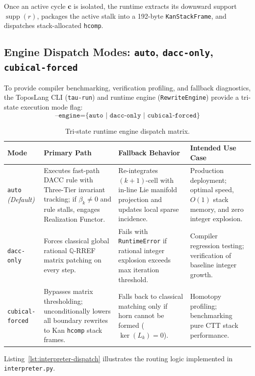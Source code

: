 \documentclass[acmsmall,screen,nonacm]{acmart}
\newcommand{\supp}{\operatorname{supp}}
\newcommand{\hcomp}{\texttt{hcomp}}
\newcommand{\KSF}{\texttt{KanStackFrame}}
\newcommand{\betak}{\beta_k}
\begin{document}
Once an active cycle $\mathbf{c}$ is isolated, the runtime extracts its downward support $\supp(r)$, packages the active stalk into a 192-byte \KSF{}, and dispatches stack-allocated \hcomp{}.

\subsection{Engine Dispatch Modes: \texttt{auto}, \texttt{dacc-only}, \texttt{cubical-forced}}
\label{sec:engine-modes}

To provide compiler benchmarking, verification profiling, and fallback diagnostics, the ToposLang CLI (\texttt{tau-run}) and runtime engine (\texttt{RewriteEngine}) provide a tri-state execution mode flag:
\[
  \texttt{--engine=\{auto | dacc-only | cubical-forced\}}
\]

\begin{table}[H]
\caption{Tri-state runtime engine dispatch matrix.}
\label{tab:dispatch-matrix}
\small
\begin{tabular}{@{}p{2.4cm}p{2.9cm}p{3.1cm}p{2.6cm}@{}}
\toprule
\textbf{Mode} & \textbf{Primary Path} & \textbf{Fallback Behavior} & \textbf{Intended Use Case} \\
\midrule
\texttt{auto} \newline \emph{(Default)} &
  Executes fast-path DACC rule with Three-Tier invariant tracking; if $\betak \neq 0$ and rule stalls, engages Realization Functor. &
  Re-integrates $(k+1)$-cell with in-line Lie manifold projection and updates local sparse incidence. &
  Production deployment; optimal speed, $O(1)$ stack memory, and zero integer explosion. \\[5pt]
\texttt{dacc-only} &
  Forces classical global rational $\mathbb{Q}$-RREF matrix patching on every step. &
  Fails with \texttt{RuntimeError} if rational integer explosion exceeds max iteration threshold. &
  Compiler regression testing; verification of baseline integer growth. \\[5pt]
\texttt{cubical-forced} &
  Bypasses matrix thresholding; unconditionally lowers all boundary rewrites to Kan \hcomp{} stack frames. &
  Falls back to classical matching only if horn cannot be formed ($\ker(L_k) = 0$). &
  Homotopy profiling; benchmarking pure CTT stack performance. \\
\bottomrule
\end{tabular}
\end{table}

Listing~\ref{lst:interpreter-dispatch} illustrates the routing logic implemented in \texttt{interpreter.py}.
\end{document}
